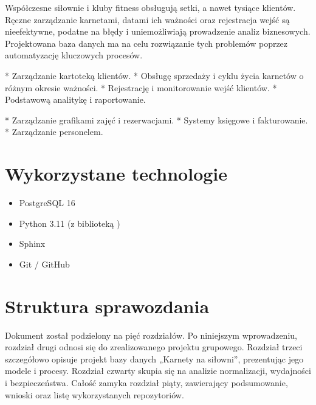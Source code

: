 \documentclass[letterpaper,10pt,polish]{sphinxmanual}
\begin{document}
\sphinxAtStartPar
{} Współczesne siłownie i kluby fitness obsługują setki, a nawet tysiące klientów. Ręczne zarządzanie karnetami, datami ich ważności oraz rejestracja wejść są nieefektywne, podatne na błędy i uniemożliwiają prowadzenie analiz biznesowych. Projektowana baza danych ma na celu rozwiązanie tych problemów poprzez automatyzację kluczowych procesów.

\sphinxAtStartPar
{}
* Zarządzanie kartoteką klientów.
* Obsługę sprzedaży i cyklu życia karnetów o różnym okresie ważności.
* Rejestrację i monitorowanie wejść klientów.
* Podstawową analitykę i raportowanie.

\sphinxAtStartPar
{}
* Zarządzanie grafikami zajęć i rezerwacjami.
* Systemy księgowe i fakturowanie.
* Zarządzanie personelem.


\section{Wykorzystane technologie}
\label{\detokenize{rozdzial1/rozdzial1:wykorzystane-technologie}}\begin{itemize}
\item {} 
\sphinxAtStartPar
{} PostgreSQL 16

\item {} 
\sphinxAtStartPar
{} Python 3.11 (z biblioteką )

\item {} 
\sphinxAtStartPar
{} Sphinx

\item {} 
\sphinxAtStartPar
{} Git / GitHub

\end{itemize}


\section{Struktura sprawozdania}
\label{\detokenize{rozdzial1/rozdzial1:struktura-sprawozdania}}
\sphinxAtStartPar
Dokument został podzielony na pięć rozdziałów. Po niniejszym wprowadzeniu, rozdział drugi odnosi się do zrealizowanego projektu grupowego. Rozdział trzeci szczegółowo opisuje projekt bazy danych „Karnety na siłowni”, prezentując jego modele i procesy. Rozdział czwarty skupia się na analizie normalizacji, wydajności i bezpieczeństwa. Całość zamyka rozdział piąty, zawierający podsumowanie, wnioski oraz listę wykorzystanych repozytoriów.
\end{document}
